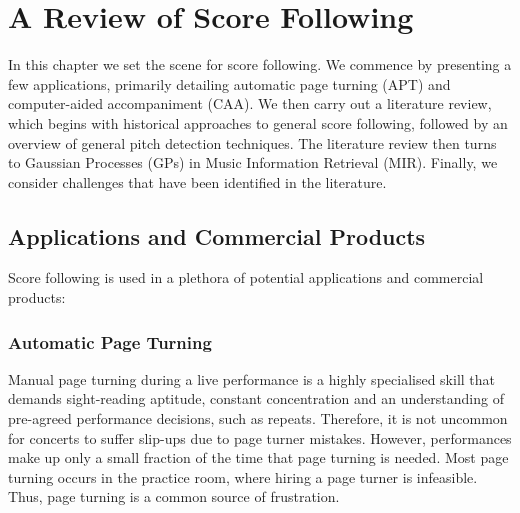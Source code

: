 \chapter{A Review of Score Following}{\label{ch:score_following_literature_review}}

In this chapter we set the scene for score following. We commence by presenting a few applications, primarily detailing automatic page turning (APT) and computer-aided accompaniment (CAA). We then carry out a literature review, which begins with historical approaches to general score following, followed by an overview of general pitch detection techniques. The literature review then turns to Gaussian Processes (GPs) in Music Information Retrieval (MIR). Finally, we consider challenges that have been identified in the literature.   

\section{Applications and Commercial Products}
Score following is used in a plethora of potential applications and commercial products:

\subsection{Automatic Page Turning} {\label{subsection:APT}}
Manual page turning during a live performance is a highly specialised skill that demands sight-reading aptitude, constant concentration and an understanding of pre-agreed performance decisions, such as repeats. Therefore, it is not uncommon for concerts to suffer slip-ups due to page turner mistakes.  However, performances make up only a small fraction of the time that page turning is needed. Most page turning occurs in the practice room, where hiring a page turner is infeasible. Thus, page turning is a common source of frustration. \\

